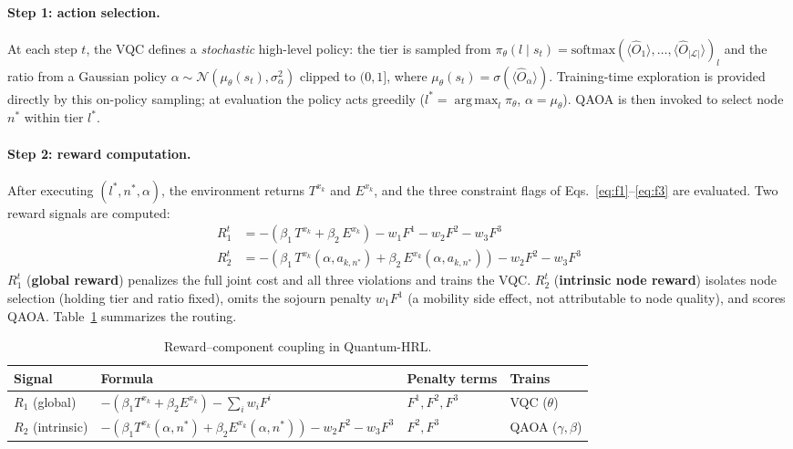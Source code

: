 \documentclass[11pt,a4paper]{article}
\theoremstyle{definition}
\DeclareMathOperator*{\argmax}{arg\,max}
\begin{document}
\paragraph{Step 1: action selection.}
At each step $t$, the VQC defines a \emph{stochastic} high-level policy: the tier is sampled from $\pi_\theta(l \mid s_t) = \mathrm{softmax}(\langle\hat O_1\rangle,\ldots,\langle\hat O_{|\mathcal L|}\rangle)_l$ and the ratio from a Gaussian policy $\alpha \sim \mathcal N(\mu_\theta(s_t), \sigma_\alpha^2)$ clipped to $(0,1]$, where $\mu_\theta(s_t) = \sigma(\langle\hat O_\alpha\rangle)$. Training-time exploration is provided directly by this on-policy sampling; at evaluation the policy acts greedily ($l^* = \argmax_l \pi_\theta$, $\alpha = \mu_\theta$). QAOA is then invoked to select node $n^*$ within tier $l^*$.

\paragraph{Step 2: reward computation.}
After executing $(l^*, n^*, \alpha)$, the environment returns $T^{x_k}$ and $E^{x_k}$, and the three constraint flags of Eqs.~\eqref{eq:f1}--\eqref{eq:f3} are evaluated. Two reward signals are computed:
\begin{align}
  R_1^t &= -\!\left(\beta_1\,T^{x_k} + \beta_2\,E^{x_k}\right)
           - w_1 F^1 - w_2 F^2 - w_3 F^3
           \label{eq:r1} \\[4pt]
  R_2^t &= -\!\left(\beta_1\,T^{x_k}(\alpha, a_{k,n^*})
           + \beta_2\,E^{x_k}(\alpha, a_{k,n^*})\right)
           - w_2 F^2 - w_3 F^3
           \label{eq:r2}
\end{align}
$R_1^t$ (\textbf{global reward}) penalizes the full joint cost and all three violations and trains the VQC. $R_2^t$ (\textbf{intrinsic node reward}) isolates node selection (holding tier and ratio fixed), omits the sojourn penalty $w_1 F^1$ (a mobility side effect, not attributable to node quality), and scores QAOA. Table~\ref{tab:reward_routing} summarizes the routing.

\begin{table}[htbp]
\centering
\caption{Reward--component coupling in Quantum-HRL.}
\label{tab:reward_routing}
\begin{tabular}{@{}llll@{}}
\toprule
\textbf{Signal} & \textbf{Formula} & \textbf{Penalty terms} & \textbf{Trains} \\
\midrule
$R_1$ (global) & $-(\beta_1 T^{x_k} {+} \beta_2 E^{x_k}) {-} \sum_i w_i F^i$ & $F^1, F^2, F^3$ & VQC ($\theta$) \\
$R_2$ (intrinsic) & $-(\beta_1 T^{x_k}(\alpha,n^*) {+} \beta_2 E^{x_k}(\alpha,n^*)) {-} w_2 F^2 {-} w_3 F^3$ & $F^2, F^3$ & QAOA ($\gamma, \beta$) \\
\bottomrule
\end{tabular}
\end{table}
\end{document}
